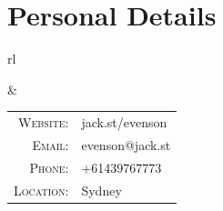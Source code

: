 \section*{Personal Details}

\begin{tabular}{rl}


&

\begin{tabular}{rl}
\textsc{Website:} & jack.st/evenson \\
\textsc{Email:} & evenson@jack.st \\
\textsc{Phone:} & +61439767773 \\
\textsc{Location:} & Sydney \\
\end{tabular}

\end{tabular}